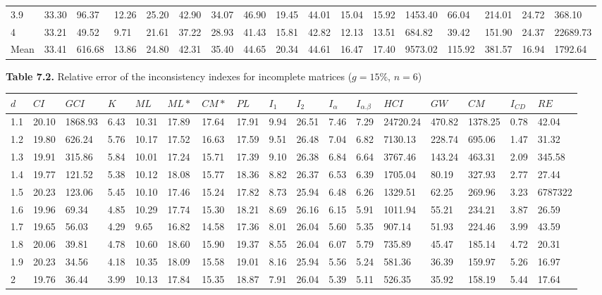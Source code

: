 \begin{adjustbox}{angle=90}
\begin{center}
{\begin{tabular}{|l|llllllllllllllll|}
3.9&33.30&96.37&12.26&25.20&42.90&34.07&46.90&19.45&44.01&15.04&15.92&1453.40&66.04&214.01&24.72&368.10  \\ 
4&33.21&49.52&9.71&21.61&37.22&28.93&41.43&15.81&42.82&12.13&13.51&684.82&39.42&151.90&24.37&22689.73  \\ \hline \hline
Mean&33.41&616.68&13.86&24.80&42.31&35.40&44.65&20.34&44.61&16.47&17.40&9573.02&115.92&381.57&16.94&1792.64  \\ \hline
\end{tabular}
}
\end{center}
\end{adjustbox}




\newpage
\textbf{Table 7.2.} Relative error of the inconsistency indexes for incomplete matrices ($g=15\%$, $n=6$)
\begin{adjustbox}{angle=90}
  \begin{center}
    \begin{tabular}{|l|llllllllllllllll|}
      \hline $d$ &
$CI$&$GCI$&$K$&$ML$&$ML*$&$CM*$&$PL$&$I_1$&$I_2$&$I_{\alpha}$&$I_{\alpha.\beta}$&$HCI$&$GW$&$CM$&$I_{CD}$&$RE$\\ \hline \hline
1.1&20.10&1868.93&6.43&10.31&17.89&17.64&17.91&9.94&26.51&7.46&7.29&24720.24&470.82&1378.25&0.78&42.04  \\ 
1.2&19.80&626.24&5.76&10.17&17.52&16.63&17.59&9.51&26.48&7.04&6.82&7130.13&228.74&695.06&1.47&31.32  \\ 
1.3&19.91&315.86&5.84&10.01&17.24&15.71&17.39&9.10&26.38&6.84&6.64&3767.46&143.24&463.31&2.09&345.58  \\ 
1.4&19.77&121.52&5.38&10.12&18.08&15.77&18.36&8.82&26.37&6.53&6.39&1705.04&80.19&327.93&2.77&27.44  \\ 
1.5&20.23&123.06&5.45&10.10&17.46&15.24&17.82&8.73&25.94&6.48&6.26&1329.51&62.25&269.96&3.23&6787322  \\ 
1.6&19.96&69.34&4.85&10.29&17.74&15.30&18.21&8.69&26.16&6.15&5.91&1011.94&55.21&234.21&3.87&26.59  \\ 
1.7&19.65&56.03&4.29&9.65&16.82&14.58&17.36&8.01&26.04&5.60&5.35&907.14&51.93&224.46&3.99&43.59  \\ 
1.8&20.06&39.81&4.78&10.60&18.60&15.90&19.37&8.55&26.04&6.07&5.79&735.89&45.47&185.14&4.72&20.31  \\ 
1.9&20.23&34.56&4.18&10.35&18.09&15.58&19.01&8.16&25.94&5.56&5.24&581.36&36.39&159.97&5.26&16.97  \\ 
2&19.76&36.44&3.99&10.13&17.84&15.35&18.87&7.91&26.04&5.39&5.11&526.35&35.92&158.19&5.44&17.64  \\ 

\end{tabular}
\end{center}
\end{adjustbox}
